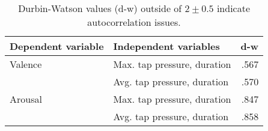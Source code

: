 \begin{table}[]
\centering
\begin{tabular}{@{}llr@{}}
\textbf{Dependent variable} & \textbf{Independent variables} & \textbf{d-w} \\ \midrule
Valence                     & Max. tap pressure, duration  & .567         \\ 
                            & Avg. tap pressure, duration  & .570         \\ \midrule
Arousal                     & Max. tap pressure, duration  & .847         \\ 
                            & Avg. tap pressure, duration  & .858        
\end{tabular}
\caption{Durbin-Watson values (d-w) outside of $2 \pm 0.5$ indicate autocorrelation issues.}
\label{tab:durbin_watson}
\end{table}